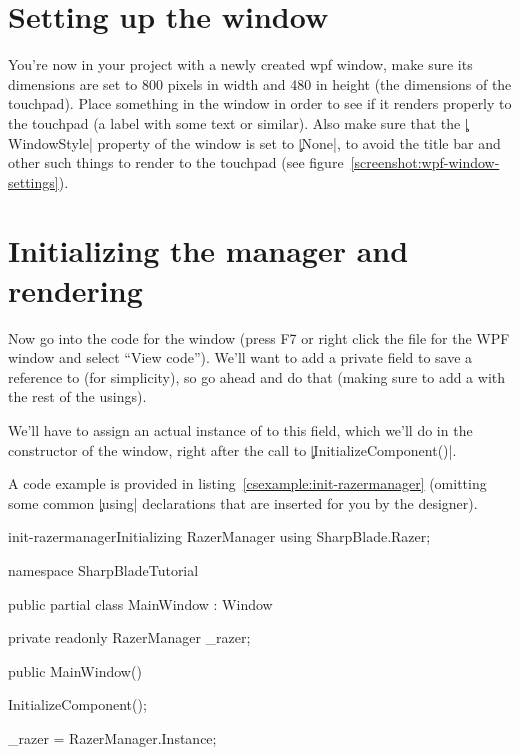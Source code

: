 
\section{Setting up the window}
You're now in your project with a newly created \gls{wpf} window, make sure its dimensions are set to 800 pixels in width and 480 in height (the dimensions of the touchpad). Place something in the window in order to see if it renders properly to the touchpad (a label with some text or similar). Also make sure that the \c|WindowStyle| property of the window is set to \c|None|, to avoid the title bar and other such things to render to the touchpad (see figure~\ref{screenshot:wpf-window-settings}).


\section{Initializing the manager and rendering}
Now go into the code for the window (press F7 or right click the file for the WPF window and select ``View code''). We'll want to add a private field to save a reference to  (for simplicity), so go ahead and do that (making sure to add a  with the rest of the usings).

We'll have to assign an actual instance of  to this field, which we'll do in the constructor of the window, right after the call to \c|InitializeComponent()|.

A code example is provided in listing~\ref{csexample:init-razermanager} (omitting some common \c|using| declarations that are inserted for you by the designer).

\begin{csexample}{init-razermanager}{Initializing RazerManager}
using SharpBlade.Razer;

namespace SharpBladeTutorial
{
    public partial class MainWindow : Window
    {
        private readonly RazerManager _razer;
        
        public MainWindow()
        {
            InitializeComponent();
            
            _razer = RazerManager.Instance;
        }
    }
}
\end{csexample}

